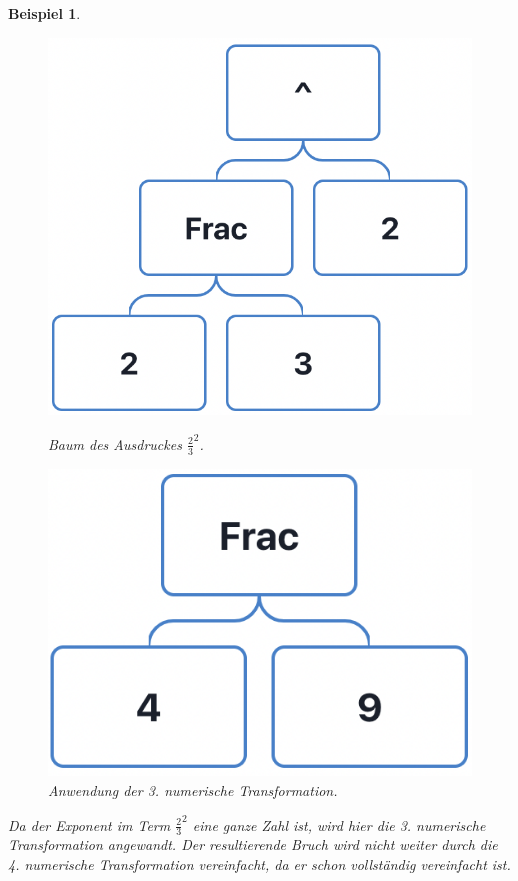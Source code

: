 \documentclass[11pt]{article}
\newtheorem{example}{Beispiel}
\begin{document}
\begin{example}
  \begin{figure}[h]
    \begin{minipage}{.5\textwidth}
      \centering
      \includegraphics[scale=0.4]{trees/power/beispiel_1_1.png}
      \caption{Baum des Ausdruckes $\frac{2}{3}^2$.}
    \end{minipage}
    \begin{minipage}{.5\textwidth}
      \centering
      \includegraphics[scale=0.4]{trees/power/beispiel_1_2.png}
      \caption{Anwendung der 3. numerische Transformation.}
    \end{minipage}
  \end{figure}
  Da der Exponent im Term $\frac{2}{3}^2$ eine ganze Zahl ist, wird hier die 3. numerische Transformation angewandt. 
  Der resultierende Bruch wird nicht weiter durch die 4. numerische Transformation vereinfacht,
  da er schon vollständig vereinfacht ist.
\end{example}
\end{document}
